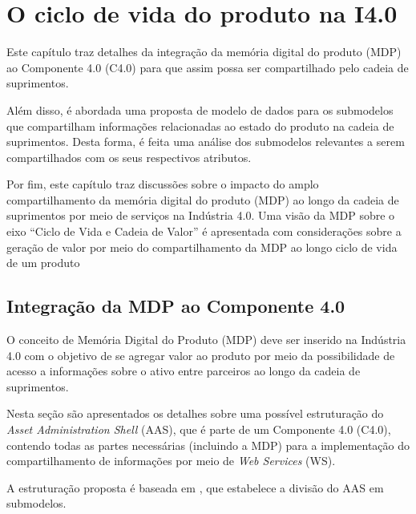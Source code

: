 \chapter{O ciclo de vida do produto na I4.0}
\label{cha:ciclo-de-vida}

Este capítulo traz detalhes da integração da memória digital do produto (MDP) ao Componente 4.0 (C4.0) para que assim possa ser compartilhado pelo cadeia de suprimentos.

Além disso, é abordada uma proposta de modelo de dados para os submodelos que compartilham informações relacionadas ao estado do produto na cadeia de suprimentos. Desta forma, é feita uma análise dos submodelos relevantes a serem compartilhados com os seus respectivos atributos.

Por fim, este capítulo traz discussões sobre o impacto do amplo compartilhamento da memória digital do produto (MDP) ao longo da cadeia de suprimentos por meio de serviços na Indústria 4.0. Uma visão da MDP sobre o eixo ``Ciclo de Vida e Cadeia de Valor'' é apresentada com considerações sobre a geração de valor por meio do compartilhamento da MDP ao longo ciclo de vida de um produto



\section{Integração da MDP ao Componente 4.0}
\label{sec:estrutura-aas}

O conceito de Memória Digital do Produto (MDP) deve ser inserido na Indústria 4.0 com o objetivo de se agregar valor ao produto por meio da possibilidade de acesso a informações sobre o ativo entre parceiros ao longo da cadeia de suprimentos.

Nesta seção são apresentados os detalhes sobre uma possível estruturação do \textit{Asset Administration Shell} (AAS), que é parte de um Componente 4.0 (C4.0), contendo todas as partes necessárias (incluindo a MDP) para a implementação do compartilhamento de informações por meio de \textit{Web Services} (WS).

A estruturação proposta é baseada em , que estabelece a divisão do AAS em submodelos.

